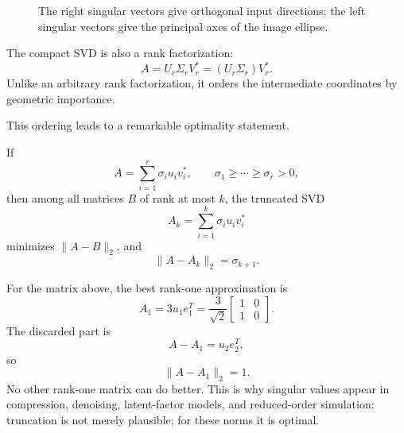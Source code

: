 \begin{figure}[H]
\centering
{}
\caption{The right singular vectors give orthogonal input directions; the left singular vectors give the principal axes of the image ellipse.}
\end{figure}

The compact SVD is also a rank factorization:
\[
  A=U_r\Sigma_rV_r^*
   =(U_r\Sigma_r)V_r^*.
\]
Unlike an arbitrary rank factorization, it orders the intermediate coordinates by geometric importance.

This ordering leads to a remarkable optimality statement.

\begin{theorem}
If
\[
  A=\sum_{i=1}^r\sigma_i u_iv_i^*,
  \qquad
  \sigma_1\ge\cdots\ge\sigma_r>0,
\]
then among all matrices \(B\) of rank at most \(k\), the truncated SVD
\[
  A_k=\sum_{i=1}^k\sigma_i u_iv_i^*
\]
minimizes \(\|A-B\|_2\), and
\[
  \|A-A_k\|_2=\sigma_{k+1}.
\]
\end{theorem}

For the matrix above, the best rank-one approximation is
\[
  A_1=3u_1e_1^T
  =\frac3{\sqrt2}
  \begin{bmatrix}
    1&0\\
    1&0
  \end{bmatrix}.
\]
The discarded part is
\[
  A-A_1=u_2e_2^T,
\]
so
\[
  \|A-A_1\|_2=1.
\]
No other rank-one matrix can do better.  This is why singular values appear in compression, denoising, latent-factor models, and reduced-order simulation: truncation is not merely plausible; for these norms it is optimal.

